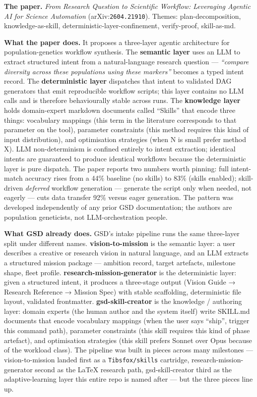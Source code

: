 \documentclass[11pt,letterpaper]{article}
\newcommand{\arxivid}[1]{\texttt{\textcolor{accent}{#1}}}
\begin{document}
\textbf{The paper.} \emph{From Research Question to Scientific Workflow:
Leveraging Agentic AI for Science Automation} (arXiv:\arxivid{2604.21910}).
Themes: plan-decomposition, knowledge-as-skill,
deterministic-layer-confinement, verify-proof, skill-as-md.

\textbf{What the paper does.} It proposes a three-layer agentic
architecture for population-genetics workflow synthesis. The
\textbf{semantic layer} uses an LLM to extract structured intent from a
natural-language research question --- \emph{``compare diversity across
these populations using these markers''} becomes a typed intent record.
The \textbf{deterministic layer} dispatches that intent to validated DAG
generators that emit reproducible workflow scripts; this layer contains
no LLM calls and is therefore behaviourally stable across runs. The
\textbf{knowledge layer} holds domain-expert markdown documents called
``Skills'' that encode three things: vocabulary mappings (this term in
the literature corresponds to that parameter on the tool), parameter
constraints (this method requires this kind of input distribution), and
optimisation strategies (when N is small prefer method X). LLM
non-determinism is confined entirely to intent extraction; identical
intents are guaranteed to produce identical workflows because the
deterministic layer is pure dispatch. The paper reports two numbers
worth pinning: full intent-match accuracy rises from a 44\% baseline (no
skills) to 83\% (skills enabled); skill-driven \emph{deferred} workflow
generation --- generate the script only when needed, not eagerly ---
cuts data transfer 92\% versus eager generation. The pattern was
developed independently of any prior GSD documentation; the authors are
population geneticists, not LLM-orchestration people.

\textbf{What GSD already does.} GSD's intake pipeline runs the same
three-layer split under different names. \textbf{vision-to-mission} is
the semantic layer: a user describes a creative or research vision in
natural language, and an LLM extracts a structured mission package ---
ambition record, target artefacts, milestone shape, fleet profile.
\textbf{research-mission-generator} is the deterministic layer: given a
structured intent, it produces a three-stage output (Vision Guide →
Research Reference → Mission Spec) with stable scaffolding,
deterministic file layout, validated frontmatter.
\textbf{gsd-skill-creator} is the knowledge / authoring layer: domain
experts (the human author and the system itself) write SKILL.md
documents that encode vocabulary mappings (when the user says ``ship'',
trigger this command path), parameter constraints (this skill requires
this kind of phase artefact), and optimisation strategies (this skill
prefers Sonnet over Opus because of the workload class). The pipeline
was built in pieces across many milestones --- vision-to-mission landed
first as a \texttt{Tibsfox/skills} cartridge, research-mission-generator
second as the LaTeX research path, gsd-skill-creator third as the
adaptive-learning layer this entire repo is named after --- but the
three pieces line up.
\end{document}
